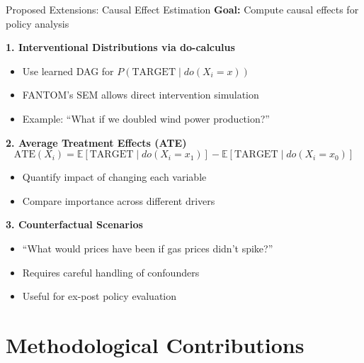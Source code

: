 \documentclass[aspectratio=169]{beamer}
\begin{document}
\begin{frame}{Proposed Extensions: Causal Effect Estimation}
\textbf{Goal:} Compute causal effects for policy analysis

\vspace{0.1cm}
\textbf{1. Interventional Distributions via do-calculus}
\begin{itemize}
    \item Use learned DAG for $P(\text{TARGET} \mid do(X_i = x))$
    \item FANTOM's SEM allows direct intervention simulation
    \item Example: ``What if we doubled wind power production?''
\end{itemize}

\vspace{0.1cm}
\textbf{2. Average Treatment Effects (ATE)}
\begin{equation*}
\text{ATE}(X_i) = \mathbb{E}[\text{TARGET} \mid do(X_i = x_1)] - \mathbb{E}[\text{TARGET} \mid do(X_i = x_0)]
\end{equation*}
\begin{itemize}
    \item Quantify impact of changing each variable
    \item Compare importance across different drivers
\end{itemize}

\vspace{0.1cm}
\textbf{3. Counterfactual Scenarios}
\begin{itemize}
    \item ``What would prices have been if gas prices didn't spike?''
    \item Requires careful handling of confounders
    \item Useful for ex-post policy evaluation
\end{itemize}
\end{frame}

\section{Methodological Contributions}
\end{document}
